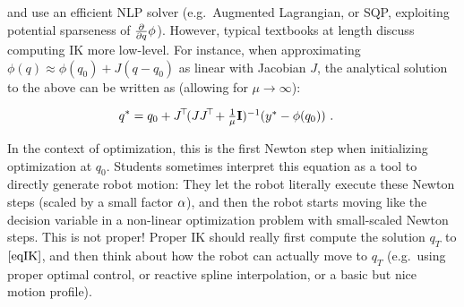 and use an efficient NLP solver (e.g.\ Augmented Lagrangian, or SQP,
exploiting potential sparseness of $\textstyle\frac{\partial}{\partial q} \phi$). However, typical
textbooks at length discuss computing IK more low-level. For instance,
when approximating $\phi(q) \approx \phi(q_0) + J (q-q_0)$ as linear
with Jacobian $J$, the analytical solution to the above can be written
as (allowing for $\mu\to\infty$):

\begin{align*}
q^*
&= q_0 +  J^{\!\top\!} (J J^{\!\top\!} + \textstyle\frac{1}{\mu} {\rm\bf I})^{-1} (y^*-\phi(q_0)) ~.
\end{align*}

In the context of optimization, this is the first Newton step when
initializing optimization at $q_0$. Students sometimes interpret this
equation as a tool to directly generate robot motion: They let the
robot literally execute these Newton steps (scaled by a small factor
$\alpha$), and then the robot starts moving like the decision variable in
a non-linear optimization problem with small-scaled Newton steps. This
is not proper! Proper IK should really first compute the solution
$q_T$ to
$\eqref{eqIK}$, and then think about how the robot can actually move
to $q_T$ (e.g.\ using proper optimal control, or reactive spline interpolation, or
a basic but nice motion profile).





